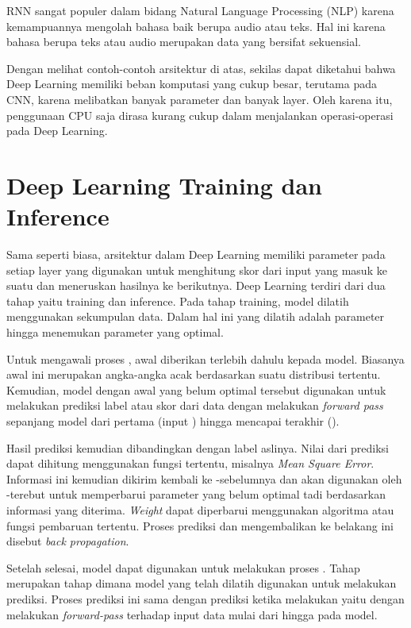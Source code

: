 RNN sangat populer dalam bidang Natural Language Processing (NLP) karena kemampuannya mengolah bahasa baik berupa audio atau teks. Hal ini karena bahasa berupa teks atau audio merupakan data yang bersifat sekuensial. 

Dengan melihat contoh-contoh arsitektur \deeplearning di atas, sekilas dapat diketahui bahwa Deep Learning memiliki beban komputasi yang cukup besar, terutama pada CNN, karena melibatkan banyak parameter dan banyak layer. Oleh karena itu, penggunaan CPU saja dirasa kurang cukup dalam menjalankan operasi-operasi pada Deep Learning.
\section{Deep Learning Training dan Inference}
Sama seperti \nn biasa, arsitektur \nn dalam Deep Learning memiliki parameter \weight pada setiap layer yang digunakan untuk menghitung skor dari input yang masuk ke suatu \layer dan meneruskan hasilnya ke \layer berikutnya. Deep Learning terdiri dari dua  tahap yaitu training dan inference. Pada tahap training, model \nn dilatih menggunakan sekumpulan data. Dalam hal ini yang dilatih adalah parameter \weight hingga menemukan parameter yang optimal.

Untuk mengawali proses \training, \weight awal diberikan terlebih dahulu kepada model. Biasanya \weight awal ini merupakan angka-angka acak berdasarkan suatu distribusi tertentu. Kemudian, model dengan \weight awal yang belum optimal tersebut digunakan untuk melakukan prediksi label atau skor dari data dengan melakukan \textit{forward pass} sepanjang model dari \layer pertama (input \layer) hingga mencapai \layer terakhir (\outputa \layer).

Hasil prediksi kemudian dibandingkan dengan label aslinya. Nilai \error dari prediksi dapat dihitung menggunakan fungsi tertentu, misalnya \textit{Mean Square Error}. Informasi \error ini kemudian dikirim kembali ke \layer-\layer sebelumnya dan akan digunakan oleh \layer-\layer terebut untuk memperbarui parameter \weight yang belum optimal tadi berdasarkan informasi \error yang diterima. \textit{Weight} dapat diperbarui menggunakan algoritma atau fungsi pembaruan \weight tertentu. Proses prediksi dan mengembalikan \error ke belakang ini disebut \textit{back propagation}. 

Setelah \training selesai, model \nn dapat digunakan untuk melakukan proses \inference. Tahap \inference merupakan tahap dimana model yang telah dilatih digunakan untuk melakukan prediksi. Proses prediksi ini sama dengan prediksi ketika melakukan \training yaitu dengan melakukan \textit{forward-pass} terhadap input data mulai dari  \layer hingga \outputa \layer pada model. 

